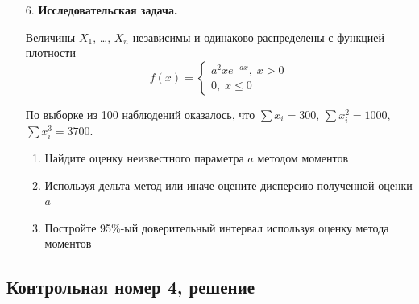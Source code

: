 \begin{enumerate}
\item[6.] \textbf{Исследовательская задача.}

Величины $X_1$, \ldots, $X_n$ независимы и одинаково распределены с функцией плотности
\[
f(x)=\begin{cases}
a^2xe^{-ax}, \; x>0 \\
0, \; x\leq 0
\end{cases}
\]

По выборке из 100 наблюдений оказалось, что $\sum x_i =300$, $\sum x_i^2=1000$,
$\sum x_i^3=3700$.

\begin{enumerate}
\item Найдите оценку неизвестного параметра $a$ методом моментов
\item Используя дельта-метод или иначе оцените дисперсию полученной оценки $a$
\item Постройте 95\%-ый доверительный интервал используя оценку метода моментов
\end{enumerate}
\end{enumerate}

\subsection{Контрольная номер 4, решение}

